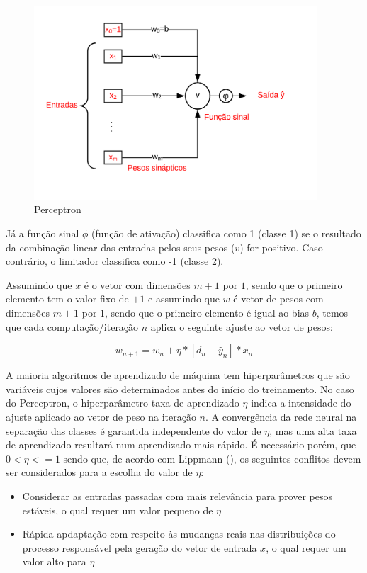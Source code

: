 \begin{figure}[H]
  \centering
  \includegraphics[width=300pt]{figuras/Perceptron.png}
  \caption{Perceptron}
  \label{fig:perceptron}
\end{figure}

Já a função sinal $\phi$ (função de ativação) classifica como 1 (classe 1) se o resultado da combinação linear das entradas pelos seus pesos ($v$) for positivo. Caso contrário, o limitador classifica como -1 (classe 2).

Assumindo que $x$ é o vetor com dimensões $m+1$ por $1$, sendo que o primeiro elemento tem o valor fixo de $+1$ e assumindo que $w$ é vetor de pesos com dimensões $m+1$ por $1$, sendo que o primeiro elemento é igual ao bias $b$, temos que cada computação/iteração $n$ aplica o seguinte ajuste ao vetor de pesos:

\begin{equation*}
\label{eqn:ajustePesoNeuronio}
    w_{n + 1}=w_n + \eta * [d_n - \hat{y}_n] * x_n
\end{equation*}

A maioria algoritmos de aprendizado de máquina tem hiperparâmetros que são variáveis cujos valores são determinados antes do início do treinamento. No caso do Perceptron, o hiperparâmetro taxa de aprendizado $\eta$ indica a intensidade do ajuste aplicado ao vetor de peso na iteração $n$. A convergência da rede neural na separação das classes é garantida independente do valor de $\eta$, mas uma alta taxa de aprendizado resultará num aprendizado mais rápido. É necessário porém, que $0<\eta<=1$ sendo que, de acordo com Lippmann (\citeyear{lippmann1987}), os seguintes conflitos devem ser considerados para a escolha do valor de $\eta$:

\begin{itemize}
    \item Considerar as entradas passadas com mais relevância para prover pesos estáveis, o qual requer um valor pequeno de $\eta$
    \item Rápida apdaptação com respeito às mudanças reais nas distribuições do processo responsável pela geração do vetor de entrada $x$, o qual requer um valor alto para $\eta$ 
\end{itemize}

